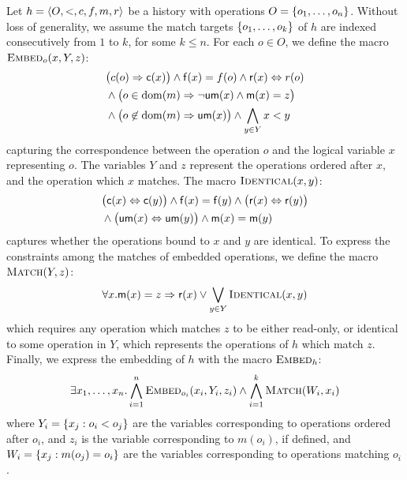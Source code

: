 Let $h = \tup{O,<,c,f,m,r}$ be a history with operations $O = \set{ o_1, \ldots,
o_n }$. Without loss of generality, we assume the match targets $\set{o_1,
\ldots, o_k}$ of $h$ are indexed consecutively from $1$ to $k$, for some $k \le
n$. For each $o \in O$, we define the macro $\textsc{Embed}_o(x,Y,z)$:
\begin{align*}
  & \big(c(o) \implies {\sf c}(x)\big) \land {\sf f}(x) = f(o) \land {\sf r}(x) \Leftrightarrow r(o) \\
  & \land \big(o \in \dom(m)
    \implies \lnot{\sf um}(x) \land {\sf m}(x) = z\big) \\
  & \land \big(o \not\in \dom(m) \implies {\sf um}(x)\big)
    \land \bigwedge_{y \in Y} x < y
\end{align*}
capturing the correspondence between the operation $o$ and the logical variable
$x$ representing $o$. The variables $Y$ and $z$ represent the operations
ordered after $x$, and the operation which $x$ matches. The macro
$\textsc{Identical}(x,y)$:
\begin{align*}
  & \big({\sf c}(x) \Leftrightarrow {\sf c}(y)\big)
    \land {\sf f}(x) = {\sf f}(y)
    \land \big({\sf r}(x) \Leftrightarrow {\sf r}(y)\big) \\
  & \land \big({\sf um}(x) \Leftrightarrow {\sf um}(y)\big)
    \land {\sf m}(x) = {\sf m}(y)
\end{align*}
captures whether the operations bound to $x$ and $y$ are identical.
To express the constraints among the matches of embedded operations, we define
the macro $\textsc{Match}(Y,z)$:
\begin{align*}
  \forall x.
  {\sf m}(x) = z \implies
  {\sf r}(x) \lor \bigvee_{y \in Y} \textsc{Identical}(x,y)
\end{align*}
which requires any operation which matches $z$ to be either read-only, or
identical to some operation in $Y$, which represents the operations of $h$
which match $z$. Finally, we express the embedding of $h$ with the macro
$\textsc{Embed}_h$:
\begin{align*}
  \exists x_1, \ldots, x_n.
  \bigwedge_{i=1}^{n} \textsc{Embed}_{o_i}(x_i,Y_i,z_i)
  \land \bigwedge_{i=1}^{k} \textsc{Match}(W_i, x_i)
\end{align*}
where $Y_i = \set{ x_j : o_i < o_j }$ are the variables corresponding to
operations ordered after $o_i$, and $z_i$ is the variable corresponding to
$m(o_i)$, if defined, and $W_i = \set{ x_j : m(o_j) = o_i }$ are the variables
corresponding to operations matching $o_i$.

